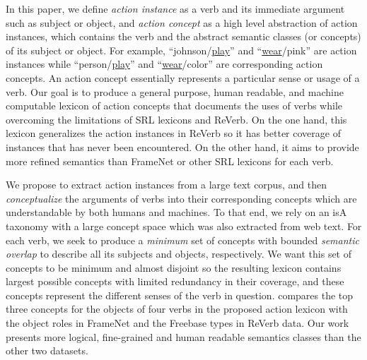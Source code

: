 %

In this paper, we define {\em action instance} as a verb and its immediate
argument such as subject or object, and {\em action concept} as a high level
abstraction of action instances, which contains the verb and the abstract
semantic classes (or concepts) of its subject or object.
For example, ``johnson/\underline{play}'' and ``\underline{wear}/pink''
are action instances
while ``person/\underline{play}'' and ``\underline{wear}/color''
are corresponding action concepts.
An action concept essentially represents a particular
sense or usage of a verb. Our goal is to produce a general purpose,
human readable, and machine computable lexicon of action concepts that
documents the uses of verbs while overcoming the limitations of
SRL lexicons and ReVerb.
On the one hand, this lexicon generalizes the action instances
in ReVerb so it has better coverage of instances that has never been
encountered. On the other hand, it aims to provide more refined semantics
than FrameNet or other SRL lexicons for each verb.

We propose to extract action instances from a large text corpus,
and then {\em conceptualize} the arguments of verbs into their
corresponding concepts which are understandable by both humans and
machines. To that end, we rely on an isA taxonomy with a large
concept space which was also extracted from web text. For each verb,
we seek to produce a {\em minimum} set of concepts with bounded
{\em semantic overlap} to describe all its subjects
and objects, respectively. We want this set of concepts to be minimum and
almost disjoint so the resulting lexicon contains largest possible
concepts with limited redundancy in their coverage, and these
concepts represent the different senses of the verb in question.
 compares the top three concepts for the objects of four verbs
in the proposed action lexicon with the object roles
in FrameNet and the Freebase types in ReVerb data.
Our work presents more logical, fine-grained and
human readable semantics classes than the other two datasets.

